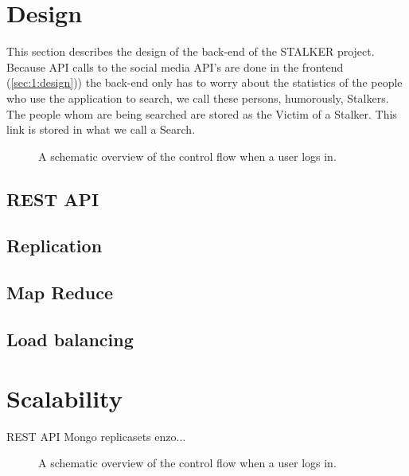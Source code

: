 \section{Design}

This section describes the design of the back-end of the STALKER project. Because API calls to the social media API's are done in the frontend (\autoref{sec:1:design})) the back-end only has to worry about the statistics of the people who use the application to search, we call these persons, humorously, Stalkers. The people whom are being searched are stored as the Victim of a Stalker. This link is stored in what we call a Search. 

\begin{figure}
	\caption{A schematic overview of the control flow when a user logs in.}
	\label{fig:2:overview_backend}
\end{figure}

\subsection{REST API}

\subsection{Replication}
\label{ssec:2:replication}

\subsection{Map Reduce}
\label{ssec:2:mapreduce}

\subsection{Load balancing}
\label{ssec:2:loadbalancing}

\section{Scalability}
REST API
Mongo replicasets enzo...

\begin{figure}
	\caption{A schematic overview of the control flow when a user logs in.}
	\label{fig:2:replica_set}
\end{figure}
